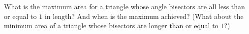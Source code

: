 What is the maximum area for a triangle
whose angle bisectors are all less than or equal to $1$ in length?
And when is the maximum achieved?
\newline
(What about the minimum area of a triangle
whose bisectors are longer than or equal to $1$?)
